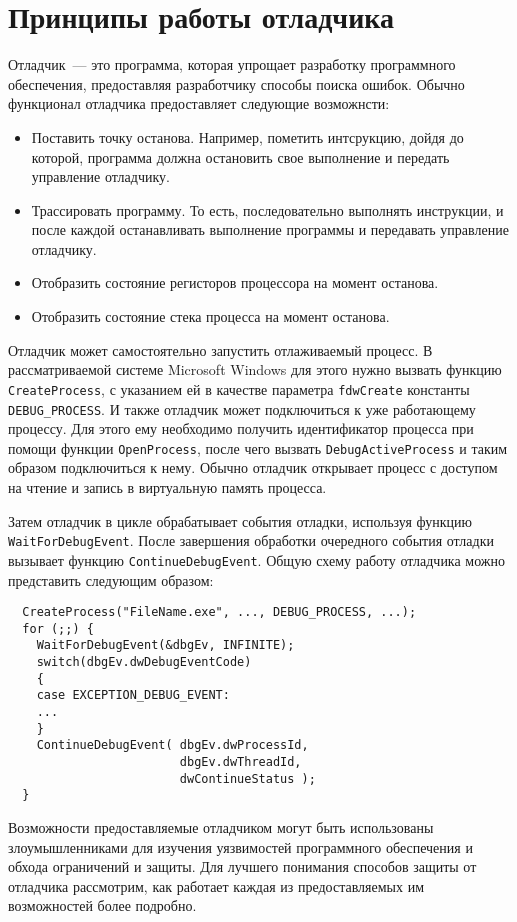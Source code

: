 \section{Принципы работы отладчика}
Отладчик~--- это программа, которая упрощает разработку программного
обеспечения, предоставляя разработчику способы поиска ошибок. Обычно функционал
отладчика предоставляет следующие возможнсти:
\begin{itemize}
  \item Поставить точку останова. Например, пометить интсрукцию, дойдя до
    которой, программа должна остановить свое выполнение и передать управление
    отладчику.
  \item Трассировать программу. То есть, последовательно выполнять инструкции, и
    после каждой останавливать выполнение программы и передавать управление
    отладчику.
  \item Отобразить состояние регисторов процессора на момент останова.
  \item Отобразить состояние стека процесса на момент останова.
\end{itemize}

Отладчик может самостоятельно запустить отлаживаемый процесс. В рассматриваемой
системе Microsoft Windows для этого нужно вызвать функцию \verb!CreateProcess!,
с указанием ей в качестве параметра \verb!fdwCreate! константы
\verb!DEBUG_PROCESS!. И также отладчик может подключиться к уже работающему
процессу. Для этого ему необходимо получить идентификатор процесса при помощи
функции \verb!OpenProcess!, после чего вызвать \verb!DebugActiveProcess! и таким
образом подключиться к нему.  Обычно отладчик открывает процесс с доступом на
чтение и запись в виртуальную память процесса.

Затем отладчик в цикле обрабатывает события отладки, используя функцию
\verb!WaitForDebugEvent!. После завершения обработки очередного события отладки
вызывает функцию \verb!ContinueDebugEvent!. Общую схему работу отладчика можно
представить следующим образом:
\begin{verbatim}
  CreateProcess("FileName.exe", ..., DEBUG_PROCESS, ...); 
  for (;;) {
    WaitForDebugEvent(&dbgEv, INFINITE);
    switch(dbgEv.dwDebugEventCode) 
    {
    case EXCEPTION_DEBUG_EVENT:
    ...
    }
    ContinueDebugEvent( dbgEv.dwProcessId,
                        dbgEv.dwThreadId,
                        dwContinueStatus );
  }
\end{verbatim}

Возможности предоставляемые отладчиком могут быть использованы злоумышленниками
для изучения уязвимостей программного обеспечения и обхода ограничений и защиты.
Для лучшего понимания способов защиты от отладчика рассмотрим, как работает
каждая из предоставляемых им возможностей более подробно.




